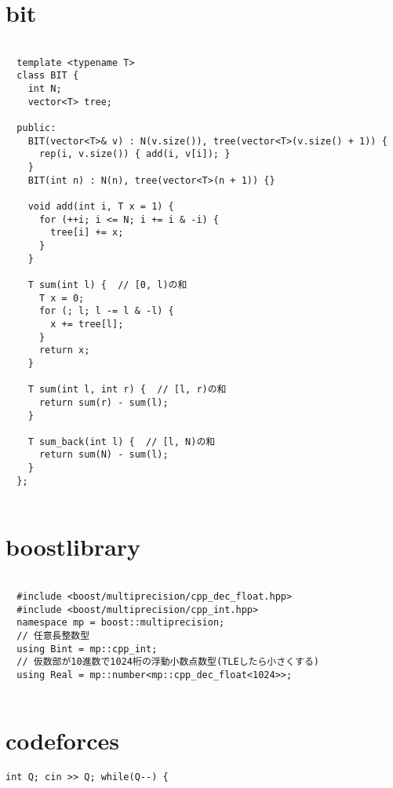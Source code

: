 \documentclass{jsarticle}
\begin{document}
\color{white}
\section{bit}
\color{black}
\begin{lstlisting}[caption=bit]

  template <typename T>
  class BIT {
    int N;
    vector<T> tree;
  
  public:
    BIT(vector<T>& v) : N(v.size()), tree(vector<T>(v.size() + 1)) {
      rep(i, v.size()) { add(i, v[i]); }
    }
    BIT(int n) : N(n), tree(vector<T>(n + 1)) {}
  
    void add(int i, T x = 1) {
      for (++i; i <= N; i += i & -i) {
        tree[i] += x;
      }
    }
  
    T sum(int l) {  // [0, l)の和
      T x = 0;
      for (; l; l -= l & -l) {
        x += tree[l];
      }
      return x;
    }
  
    T sum(int l, int r) {  // [l, r)の和
      return sum(r) - sum(l);
    }
  
    T sum_back(int l) {  // [l, N)の和
      return sum(N) - sum(l);
    }
  };
  

\end{lstlisting}

\color{white}
\section{boostlibrary}
\color{black}
\begin{lstlisting}[caption=boostlibrary]

  #include <boost/multiprecision/cpp_dec_float.hpp>
  #include <boost/multiprecision/cpp_int.hpp>
  namespace mp = boost::multiprecision;
  // 任意長整数型
  using Bint = mp::cpp_int;
  // 仮数部が10進数で1024桁の浮動小数点数型(TLEしたら小さくする)
  using Real = mp::number<mp::cpp_dec_float<1024>>;
  

\end{lstlisting}

\color{white}
\section{codeforces}
\color{black}
\begin{lstlisting}[caption=codeforces]
int Q; cin >> Q; while(Q--) {    

\end{lstlisting}

\color{white}
\end{document}
